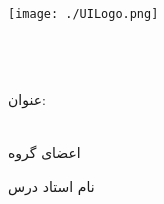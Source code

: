 \documentclass[]{article}
\begin{document}

\begin{center}

    \texttt{[image: ./UILogo.png]}
    
    \University \\
    \Department\\
    
    
    \begin{large}
    \vspace{0.5cm}
    
    \end{large}
    
    \vspace{1cm}
    \begin{latin}
        {\Large\textbf\EnglishCourseTitle}
    \end{latin}
    \begin{center}
        \CourseName
    \end{center}
    
    \vspace{1cm}
    {عنوان:}\\[1.2em]
    {\LARGE\textbf{\CourseReportTitle}}\\ 

    \vspace{1.25cm}

    {اعضای گروه}\\
    \begin{spacing}{1.25}
        {\large\textbf{\GroupeMembers}}
    \end{spacing}
    
    \vspace{1.25cm}
    
    {\large\textbf{\courseSemester}}

    \vspace{1cm}
    {نام استاد درس}\\[0.5em]
    {\large\textbf{\CourseProfessor}}
    
    \vspace{1.2cm}

    \pagebreak
    
    \end{center}
\end{document}

